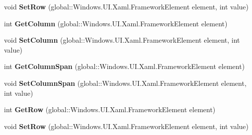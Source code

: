 \begin{DoxyCompactItemize}
\item 
\mbox{\label{interface_windows_1_1_u_i_1_1_xaml_1_1_controls_1_1_i_grid_statics_a74203a6ea6e2a26830dd353da361789f}} 
void {\bfseries Set\+Row} (global\+::\+Windows.\+U\+I.\+Xaml.\+Framework\+Element element, int value)
\item 
\mbox{\label{interface_windows_1_1_u_i_1_1_xaml_1_1_controls_1_1_i_grid_statics_a5669711d053518b49290b7556a8ba584}} 
int {\bfseries Get\+Column} (global\+::\+Windows.\+U\+I.\+Xaml.\+Framework\+Element element)
\item 
\mbox{\label{interface_windows_1_1_u_i_1_1_xaml_1_1_controls_1_1_i_grid_statics_a73679f372e5c95be6df634924e36dc2c}} 
void {\bfseries Set\+Column} (global\+::\+Windows.\+U\+I.\+Xaml.\+Framework\+Element element, int value)
\item 
\mbox{\label{interface_windows_1_1_u_i_1_1_xaml_1_1_controls_1_1_i_grid_statics_aeb5b4c961c8bdfd7fb2625d5ae893664}} 
int {\bfseries Get\+Column\+Span} (global\+::\+Windows.\+U\+I.\+Xaml.\+Framework\+Element element)
\item 
\mbox{\label{interface_windows_1_1_u_i_1_1_xaml_1_1_controls_1_1_i_grid_statics_ac9860a85b2ffd6bee23d564be6744824}} 
void {\bfseries Set\+Column\+Span} (global\+::\+Windows.\+U\+I.\+Xaml.\+Framework\+Element element, int value)
\item 
\mbox{\label{interface_windows_1_1_u_i_1_1_xaml_1_1_controls_1_1_i_grid_statics_a7cab98248e8823c599dc35102ff746c5}} 
int {\bfseries Get\+Row} (global\+::\+Windows.\+U\+I.\+Xaml.\+Framework\+Element element)
\item 
\mbox{\label{interface_windows_1_1_u_i_1_1_xaml_1_1_controls_1_1_i_grid_statics_a74203a6ea6e2a26830dd353da361789f}} 
void {\bfseries Set\+Row} (global\+::\+Windows.\+U\+I.\+Xaml.\+Framework\+Element element, int value)

\end{DoxyCompactItemize}
